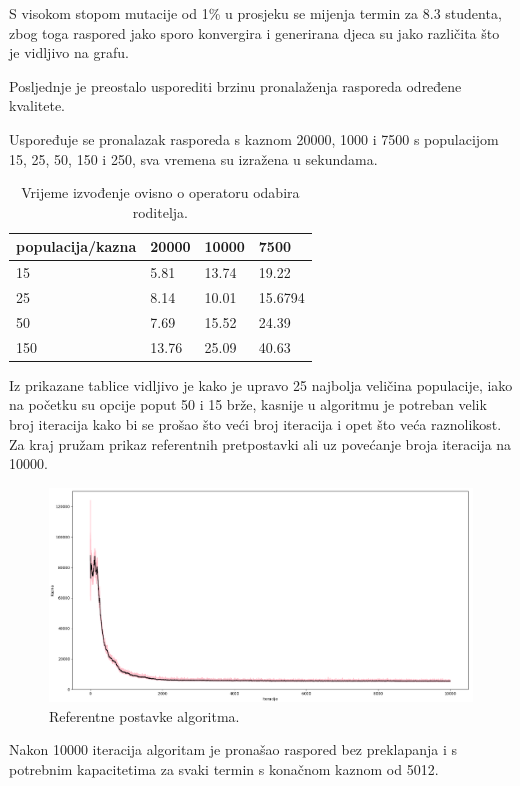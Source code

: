 \documentclass[times, utf8, zavrsni]{fer}
\begin{document}
S visokom stopom mutacije od 1\% u prosjeku se mijenja termin za 8.3 studenta, zbog toga raspored jako sporo konvergira i generirana djeca su jako različita što je vidljivo na grafu.

Posljednje je preostalo usporediti brzinu pronalaženja rasporeda određene kvalitete. 
\newpage

Uspoređuje se pronalazak rasporeda s kaznom 20000, 1000 i 7500 s populacijom 15, 25, 50, 150 i 250, sva vremena su izražena u sekundama.

\begin{table}[htb]
\caption{Vrijeme izvođenje ovisno o operatoru odabira roditelja.}
\label{tbl:iter-roditelj}
\centering
\begin{tabular}{llll} \hline
populacija/kazna & 20000 &  10000 & 7500\\ \hline
15 & 5.81 & 13.74 & 19.22\\
25 & 8.14 & 10.01 & 15.6794\\
50 & 7.69 & 15.52 & 24.39\\
150 & 13.76 & 25.09 & 40.63\\ \hline
\end{tabular}
\end{table}

Iz prikazane tablice vidljivo je kako je upravo 25 najbolja veličina populacije, iako na početku su opcije poput 50 i 15 brže, kasnije u algoritmu je potreban velik broj iteracija kako bi se prošao što veći broj iteracija i opet što veća raznolikost. Za kraj pružam prikaz referentnih pretpostavki ali uz povećanje broja iteracija na 10000.

\begin{figure}[htb]
\centering
\includegraphics[width=15cm]{images/final.png}
\caption{Referentne postavke algoritma.}
\label{fig:final}
\end{figure}

Nakon 10000 iteracija algoritam je pronašao raspored bez preklapanja i s potrebnim kapacitetima za svaki termin s konačnom kaznom od 5012.
\end{document}
